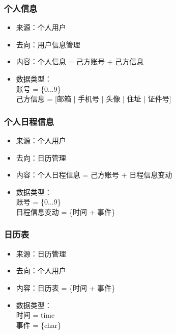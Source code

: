             \subsubsection{个人信息}
            \begin{itemize}
                \item 来源：个人用户
                \item 去向：用户信息管理
                \item 内容：个人信息 = 己方账号 + 己方信息
                \item 数据类型：\\
                账号 = \{0...9\}\\
                己方信息 = [邮箱 | 手机号 | 头像 | 住址 | 证件号]\\
            \end{itemize}
            \subsubsection{个人日程信息}
            \begin{itemize}
                \item 来源：个人用户
                \item 去向：日历管理
                \item 内容：个人日程信息 = 己方账号 + 日程信息变动
                \item 数据类型：\\
                账号 = \{0...9\}\\
                日程信息变动 = \{时间 + 事件\}\\
            \end{itemize}
            \subsubsection{日历表}
            \begin{itemize}
                \item 来源：日历管理
                \item 去向：个人用户
                \item 内容：日历表 = \{时间 + 事件\}
                \item 数据类型：\\
                时间 = time\\
                事件 = \{char\}\\
            \end{itemize}
